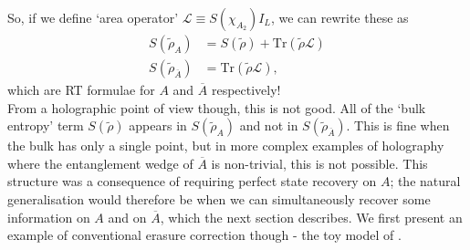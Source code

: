 \documentclass[12pt,a4paper]{report}
\numberwithin{equation}{section}
\newcommand{\ol}[1]{\overline{#1}}
\newcommand{\tr}{\text{Tr}}
\theoremstyle{definition}
\theoremstyle{theorem}
\theoremstyle{theorem}
\theoremstyle{example}
\theoremstyle{definition}
\begin{document}
So, if we define `area operator' $\mathcal{L}\equiv S(\chi_{A_{2}})I_{L}$, we can rewrite these as
\begin{equation}
	\begin{aligned}
		S(\tilde{\rho}_{A})&=S(\tilde{\rho})+\tr(\tilde{\rho}\mathcal{L})\\
		S(\tilde{\rho}_{\ol{A}})&=\tr(\tilde{\rho}\mathcal{L}),
	\end{aligned}
\end{equation}
which are RT formulae for $A$ and $\ol{A}$ respectively!\\
From a holographic point of view though, this is not good. All of the `bulk entropy' term $S(\tilde{\rho})$ appears in $S(\tilde{\rho}_{A})$ and not in $S(\tilde{\rho}_{\ol{A}})$. This is fine when the bulk has only a single point, but in more complex examples of holography where the entanglement wedge of $\ol{A}$ is non-trivial, this is not possible. This structure was a consequence of requiring perfect state recovery on $A$; the natural generalisation would therefore be when we can simultaneously recover some information on $A$ and on $\ol{A}$, which the next section describes. We first present an example of conventional erasure correction though - the toy model of \cite{Harlow}.
\end{document}
